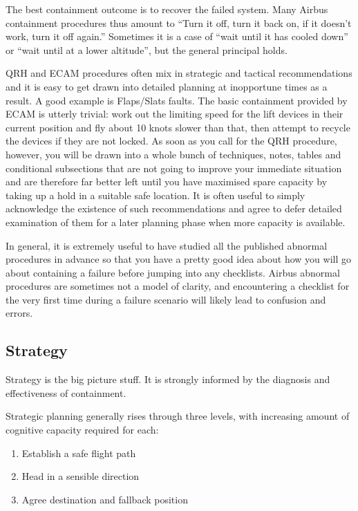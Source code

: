 \documentclass[a5paper,11pt,titlepage]{article}
\begin{document}
The best containment outcome is to recover the failed system. Many
Airbus containment procedures thus amount to ``Turn it off, turn it back
on, if it doesn't work, turn it off again.'' Sometimes it is a case of
``wait until it has cooled down'' or ``wait until at a lower altitude'',
but the general principal holds.

QRH and ECAM procedures often mix in strategic and tactical
recommendations and it is easy to get drawn into detailed planning at
inopportune times as a result. A good example is Flaps/Slats faults. The
basic containment provided by ECAM is utterly trivial: work out the
limiting speed for the lift devices in their current position and fly
about 10 knots slower than that, then attempt to recycle the devices if
they are not locked. As soon as you call for the QRH procedure, however,
you will be drawn into a whole bunch of techniques, notes, tables and
conditional subsections that are not going to improve your immediate
situation and are therefore far better left until you have maximised
spare capacity by taking up a hold in a suitable safe location. It is
often useful to simply acknowledge the existence of such recommendations
and agree to defer detailed examination of them for a later planning
phase when more capacity is available.

In general, it is extremely useful to have studied all the published
abnormal procedures in advance so that you have a pretty good idea about
how you will go about containing a failure before jumping into any
checklists. Airbus abnormal procedures are sometimes not a model of
clarity, and encountering a checklist for the very first time during a
failure scenario will likely lead to confusion and errors.

\subsection{Strategy}

Strategy is the big picture stuff. It is strongly informed by the
diagnosis and effectiveness of containment.

Strategic planning generally rises through three levels, with increasing
amount of cognitive capacity required for each:

\begin{enumerate}
\item Establish a safe flight path
\item Head in a sensible direction
\item Agree destination and fallback position
\end{enumerate}
\end{document}
